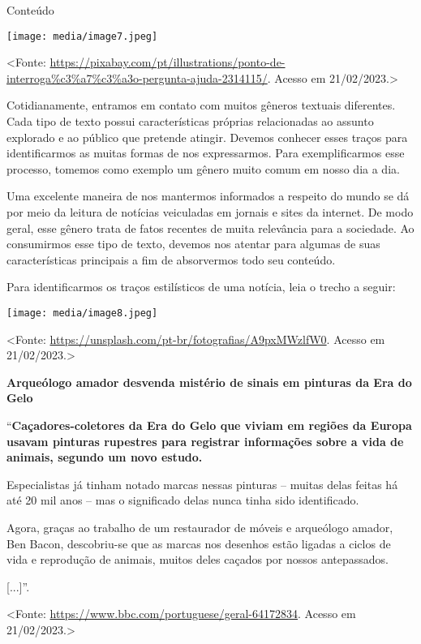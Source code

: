 Conteúdo

\texttt{[image: media/image7.jpeg]}

\textless{}Fonte:
\url{https://pixabay.com/pt/illustrations/ponto-de-interroga\%c3\%a7\%c3\%a3o-pergunta-ajuda-2314115/}.
Acesso em 21/02/2023.\textgreater{}

Cotidianamente, entramos em contato com muitos gêneros textuais
diferentes. Cada tipo de texto possui características próprias
relacionadas ao assunto explorado e ao público que pretende atingir.
Devemos conhecer esses traços para identificarmos as muitas formas de
nos expressarmos. Para exemplificarmos esse processo, tomemos como
exemplo um gênero muito comum em nosso dia a dia.

Uma excelente maneira de nos mantermos informados a respeito do mundo se
dá por meio da leitura de notícias veiculadas em jornais e sites da
internet. De modo geral, esse gênero trata de fatos recentes de muita
relevância para a sociedade. Ao consumirmos esse tipo de texto, devemos
nos atentar para algumas de suas características principais a fim de
absorvermos todo seu conteúdo.

Para identificarmos os traços estilísticos de uma notícia, leia o trecho
a seguir:

\texttt{[image: media/image8.jpeg]}

\textless{}Fonte:
\url{https://unsplash.com/pt-br/fotografias/A9pxMWzlfW0}. Acesso em
21/02/2023.\textgreater{}

\textbf{Arqueólogo amador desvenda mistério de sinais em pinturas da Era
do Gelo}

``\textbf{Caçadores-coletores da Era do Gelo que viviam em regiões da
Europa usavam pinturas rupestres para registrar informações sobre a vida
de animais, segundo um novo estudo.}

Especialistas já tinham notado marcas nessas pinturas -- muitas delas
feitas há até 20 mil anos -- mas o significado delas nunca tinha sido
identificado.

Agora, graças ao trabalho de um restaurador de móveis e arqueólogo
amador, Ben Bacon, descobriu-se que as marcas nos desenhos estão ligadas
a ciclos de vida e reprodução de animais, muitos deles caçados por
nossos antepassados.

{[}...{]}''.

\textless{}Fonte: \url{https://www.bbc.com/portuguese/geral-64172834}.
Acesso em 21/02/2023.\textgreater{}

